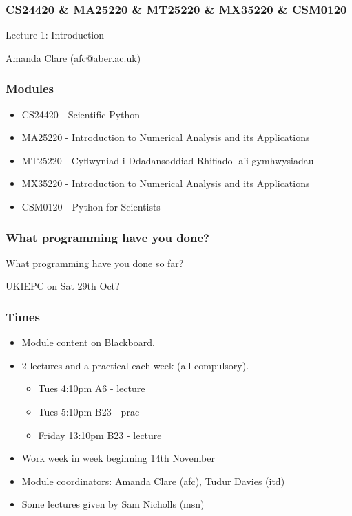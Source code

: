 \documentclass{beamer}
\begin{document}
\begin{frame}
\frametitle{CS24420 \& MA25220 \& MT25220 \& MX35220 \& CSM0120}

\begin{center}
\begin{huge}
Lecture 1: Introduction 
\end{huge}
\bigskip

Amanda Clare (afc@aber.ac.uk)

\end{center}
\end{frame}

\begin{frame}
\frametitle{Modules}
\begin{itemize}
\item CS24420 - Scientific Python
\item MA25220 - Introduction to Numerical Analysis and its
  Applications
\item MT25220 - Cyflwyniad i Ddadansoddiad Rhifiadol a'i gymhwysiadau
\item MX35220 - Introduction to Numerical Analysis and its Applications
\item CSM0120 - Python for Scientists
\end{itemize}
\end{frame}

\begin{frame}
\frametitle{What programming have you done?}

What programming have you done so far? 

\bigskip

UKIEPC on Sat 29th Oct?

\end{frame}


\begin{frame}
\frametitle{Times}
\begin{itemize}
\item Module content on Blackboard.
\item 2 lectures and a practical each week (all compulsory).
\begin{itemize}
\item Tues 4:10pm A6 - lecture
\item Tues 5:10pm B23 - prac
\item Friday 13:10pm B23 - lecture 
\end{itemize}
\item Work week in week beginning 14th November 
\item Module coordinators: Amanda Clare (afc), Tudur Davies (itd)
\item Some lectures given by Sam Nicholls (msn)
\end{itemize}
\end{frame}
\end{document}
